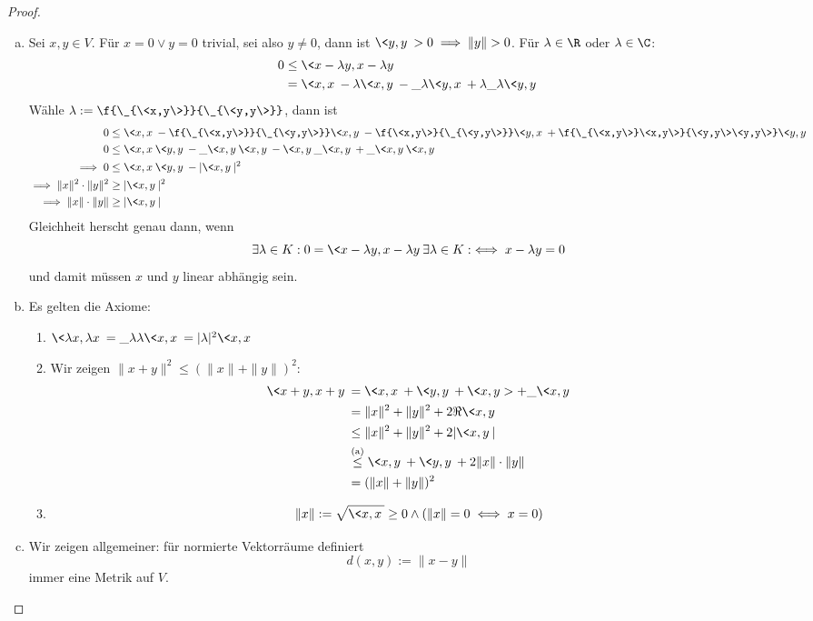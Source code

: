 \documentclass{mycourse}
\begin{document}
\begin{thm}
	\begin{proof}
		\begin{enumerate}[(a)]
			\item
				Sei $x,y\in V$.
				Für $x=0 \lor y=0$ trivial, sei also $y\neq 0$, dann ist $\<y,y\> > 0 \implies \|y\|>0$.
				Für $\lambda\in \R$ oder $\lambda\in \C$:
				\begin{align*}
					0&\le \<x-\lambda y,x-\lambda y\> \\
					&= \<x,x\> - \lambda \<x,y\> - \_\lambda \<y,x\> + \lambda\_\lambda\<y,y\>
				\end{align*}
				Wähle $\lambda := \f {\_{\<x,y\>}}{\_{\<y,y\>}}$, dann ist
				\begin{align*}
					0&\le \<x,x\> - \f {\_{\<x,y\>}}{\_{\<y,y\>}} \<x,y\> - \f {\<x,y\>}{\_{\<y,y\>}}\<y,x\> + \f{\_{\<x,y\>}\<x,y\>}{\<y,y\>\<y,y\>} \<y,y\> \\
					0&\le \<x,x\>\<y,y\> - \_{\<x,y\>}\<x,y\> - \<x,y\>\_{\<x,y\>} + \_{\<x,y\>}\<x,y\> \\
					\implies 0 &\le \<x,x\>\<y,y\> - |\<x,y\>|^2\\
					\implies \|x\|^2\cdot \|y\|^2 &\ge |\<x,y\>|^2\\
					\implies \|x\|\cdot \|y\| &\ge |\<x,y\>|
				\end{align*}
				Gleichheit herscht genau dann, wenn
				\[
					\exists \lambda\in K : 0= \<x-\lambda y, x-\lambda y\> \exists \lambda\in K :\iff x-\lambda y = 0
				\]
				und damit müssen $x$ und $y$ linear abhängig sein.
			\item
				Es gelten die Axiome:
				\begin{enumerate}[({N}1)]
					\item $\<\lambda  x, \lambda x\> = \_{\lambda}\lambda \<x,x\> = |\lambda|^2\<x,x\>$
					\item
						Wir zeigen $\|x+y\|^2 \le (\|x\| + \|y\|)^2$:
						\begin{align*}
							\<x+y,x+y\> &= \<x,x\> + \<y,y\> + \<x,y> + \_{\<x,y\>}\\
										&= \|x\|^2 + \|y\|^2 + 2\Re \<x,y\>\\
							   &\le \|x\|^2 + \|y\|^2 + 2|\<x,y\>|\\
							   &\stackrel{\text{(a)}}\le  \<x,y\> + \<y,y\> + 2\|x\|\cdot \|y\| \\
							   &= (\|x\| + \|y\|)^2
						\end{align*}
					\item
						\[
							\|x\| := \sqrt{\<x,x\>} \ge 0 \land (\|x\|=0 \iff x=0)
						\]
				\end{enumerate}
			\item
				Wir zeigen allgemeiner: für normierte Vektorräume definiert
				\[
					d(x,y) := \|x-y\|
				\]
				immer eine Metrik auf $V$.


\end{enumerate}
\end{proof}
\end{thm}
\end{document}
